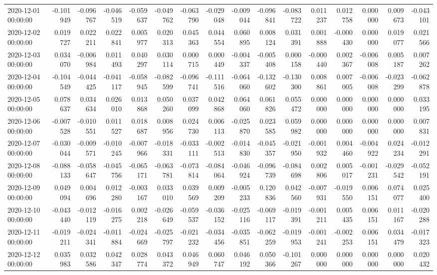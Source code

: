 \begin{tabular}{lrrrrrrrrrrrrrrr}
2020-12-01 00:00:00 & -0.101949 & -0.096767 & -0.046519 & -0.059637 & -0.049762 & -0.063790 & -0.029048 & -0.009044 & -0.096841 & -0.083722 & 0.011237 & 0.012758 & 0.000000 & 0.009673 & -0.043101 \\
2020-12-02 00:00:00 & 0.019727 & 0.022211 & 0.022841 & 0.005977 & 0.020313 & 0.045363 & 0.044554 & 0.060895 & 0.008124 & 0.031391 & 0.001888 & -0.000430 & 0.000000 & 0.019077 & 0.021566 \\
2020-12-03 00:00:00 & 0.034070 & -0.006984 & 0.011493 & 0.040297 & 0.030114 & 0.000715 & 0.000449 & -0.004337 & -0.005408 & 0.000158 & -0.000440 & 0.002367 & -0.006008 & 0.005187 & 0.007262 \\
2020-12-04 00:00:00 & -0.104549 & -0.044425 & -0.041117 & -0.058945 & -0.082599 & -0.096741 & -0.111516 & -0.064060 & -0.132602 & -0.130300 & 0.008861 & 0.007005 & -0.006008 & -0.023299 & -0.062878 \\
2020-12-05 00:00:00 & 0.078637 & 0.034634 & 0.026010 & 0.013868 & 0.050260 & 0.037099 & 0.042868 & 0.064060 & 0.061826 & 0.055472 & 0.000000 & 0.000000 & 0.000000 & 0.000000 & 0.033195 \\
2020-12-06 00:00:00 & -0.007528 & -0.010551 & 0.011527 & 0.018687 & 0.008956 & 0.024730 & 0.006113 & -0.025870 & 0.023585 & 0.059982 & 0.000000 & 0.000000 & 0.000000 & 0.000000 & 0.007831 \\
2020-12-07 00:00:00 & -0.030044 & -0.009571 & -0.010245 & -0.007966 & -0.018331 & -0.033111 & -0.002513 & -0.014830 & -0.045357 & -0.021950 & -0.001932 & 0.004460 & -0.004922 & 0.024234 & -0.012291 \\
2020-12-08 00:00:00 & -0.088133 & -0.058647 & -0.045756 & -0.065171 & -0.063781 & -0.073814 & -0.084064 & -0.046924 & -0.096739 & -0.084698 & 0.002806 & 0.005017 & -0.001231 & -0.029542 & -0.052191 \\
2020-12-09 00:00:00 & 0.049094 & 0.004696 & 0.012280 & -0.003167 & 0.033010 & 0.039569 & 0.009209 & -0.005233 & 0.120836 & 0.042560 & -0.007931 & -0.019550 & 0.006151 & 0.074077 & 0.025400 \\
2020-12-10 00:00:00 & -0.043440 & -0.012119 & -0.016275 & 0.002218 & -0.026649 & -0.059537 & -0.036152 & -0.025116 & -0.069117 & -0.019391 & -0.001211 & 0.005435 & 0.006151 & 0.011167 & -0.020288 \\
2020-12-11 00:00:00 & -0.019211 & -0.024341 & -0.011884 & -0.024669 & -0.025797 & -0.021232 & -0.034456 & -0.035851 & -0.062259 & -0.019953 & -0.001241 & -0.002253 & 0.006151 & 0.034479 & -0.017323 \\
2020-12-12 00:00:00 & 0.035983 & 0.032586 & 0.042347 & 0.028774 & 0.043372 & 0.046949 & 0.060747 & 0.046192 & 0.050366 & -0.101267 & 0.000000 & 0.000000 & 0.000000 & 0.000000 & 0.020432 \\

\end{tabular}
